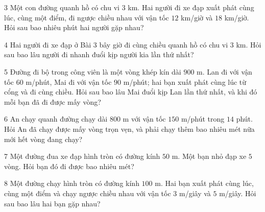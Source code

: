 \gap
\begin{probbox}{3}{\relax}
Một con đường quanh hồ có chu vi $3$ km. Hai người đi xe đạp xuất phát cùng lúc, cùng một điểm, đi ngược chiều nhau với vận tốc $12$ km/giờ và $18$ km/giờ. Hỏi sau bao nhiêu phút hai người gặp nhau?
\end{probbox}
\gap
\begin{probbox}{4}{\relax}
Hai người đi xe đạp ở Bài 3 bây giờ đi cùng chiều quanh hồ có chu vi $3$ km. Hỏi sau bao lâu người đi nhanh đuổi kịp người kia lần thứ nhất?
\end{probbox}
\gap
\begin{probbox}{5}{\relax}
Đường đi bộ trong công viên là một vòng khép kín dài $900$ m. Lan đi với vận tốc $60$ m/phút, Mai đi với vận tốc $90$ m/phút; hai bạn xuất phát cùng lúc từ cổng và đi cùng chiều. Hỏi sau bao lâu Mai đuổi kịp Lan lần thứ nhất, và khi đó mỗi bạn đã đi được mấy vòng?
\end{probbox}
\gap
\begin{probbox}{6}{\relax}
An chạy quanh đường chạy dài $800$ m với vận tốc $150$ m/phút trong $14$ phút. Hỏi An đã chạy được mấy vòng trọn vẹn, và phải chạy thêm bao nhiêu mét nữa mới hết vòng đang chạy?
\end{probbox}
\gap
\begin{probbox}{7}{\relax}
Một đường đua xe đạp hình tròn có đường kính $50$ m. Một bạn nhỏ đạp xe $5$ vòng. Hỏi bạn đó đi được bao nhiêu mét?
\end{probbox}
\gap
\begin{probbox}{8}{\relax}
Một đường chạy hình tròn có đường kính $100$ m. Hai bạn xuất phát cùng lúc, cùng một điểm và chạy ngược chiều nhau với vận tốc $3$ m/giây và $5$ m/giây. Hỏi sau bao lâu hai bạn gặp nhau?
\end{probbox}
